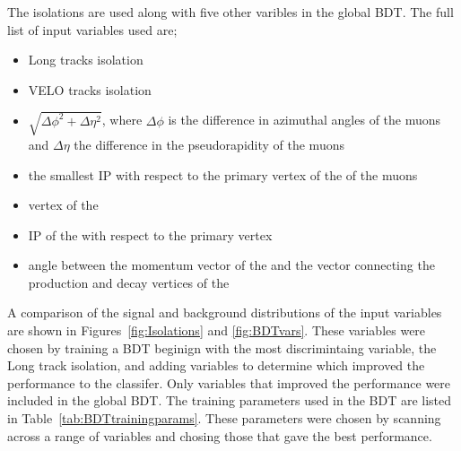 The isolations are used along with five other varibles in the global BDT. The full list of input variables used are;
\begin{itemize}
\item Long tracks isolation
\item VELO tracks isolation
\item $\sqrt{\Delta \phi^{2} + \Delta \eta^{2}}$, where $\Delta \phi$ is the difference in azimuthal angles of the muons and $\Delta \eta$ the difference in the pseudorapidity of the muons
\item the smallest IP \chisqd with respect to the primary vertex of the \bsmumu of the muons
\item vertex \chisqd of the \bs
\item IP \chisqd of the \bs with respect to the primary vertex
\item angle between the momentum vector of the \bs and the vector connecting the production and decay vertices of the \bs
\end{itemize}

A comparison of the signal and background distributions of the input variables are shown in Figures~\ref{fig:Isolations} and \ref{fig:BDTvars}. These variables were chosen by training a BDT beginign with the most discrimintaing variable, the Long track isolation, and adding variables to determine which improved the performance to the classifer. Only variables that improved the performance were included in the global BDT. The training parameters used in the BDT are listed in Table~\ref{tab:BDTtrainingparams}. These parameters were chosen by scanning across a range of variables and chosing those that gave the best performance. 

